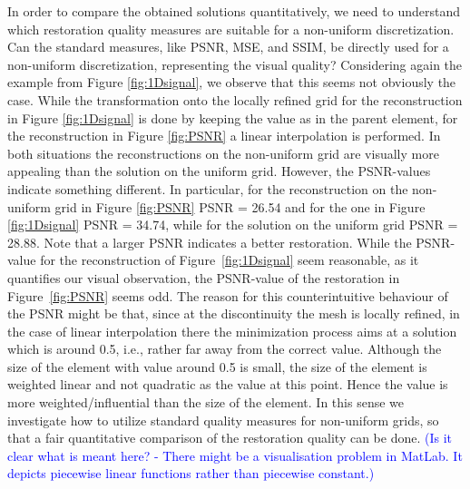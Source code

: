 \documentclass[enabledeprecatedfontcommands,cleardoublepage=empty,headsepline,twoside,11pt,DIV=15,BCOR=12mm,final]{scrartcl}
\begin{document}
 In order to compare the obtained solutions quantitatively, we need to understand which restoration quality measures are suitable for a non-uniform discretization. Can the standard measures, like PSNR, MSE, and SSIM, be directly used for a non-uniform discretization, representing the visual quality? Considering again the example from Figure \ref{fig:1Dsignal}, we observe that this seems not obviously the case. While the transformation onto the locally refined grid for the reconstruction in Figure \ref{fig:1Dsignal} is done by keeping the value as in the parent element, for the reconstruction in Figure \ref{fig:PSNR} a linear interpolation is performed. In both situations the reconstructions on the non-uniform grid are visually more appealing than the solution on the uniform grid. However, the PSNR-values indicate something different. In particular, for the reconstruction on the non-uniform grid in Figure \ref{fig:PSNR} PSNR = 26.54 and for the one in Figure \ref{fig:1Dsignal} PSNR = 34.74, while for the solution on the uniform grid PSNR = 28.88. Note that a larger PSNR indicates a better restoration. While the PSNR-value for the reconstruction of Figure~\ref{fig:1Dsignal} seem reasonable, as it quantifies our visual observation, the PSNR-value of the restoration in Figure~\ref{fig:PSNR} seems odd. The reason for this counterintuitive behaviour of the PSNR might be that, since at the discontinuity the mesh is locally refined, in the case of linear interpolation there the minimization process aims at a solution which is around 0.5, i.e., rather far away from the correct value. Although the size of the element with value around 0.5 is small, the size of the element is weighted linear and not quadratic as the value at this point. Hence the value is more weighted/influential than the size of the element. In this sense we investigate how to utilize standard quality measures for non-uniform grids, so that a fair quantitative comparison of the restoration quality can be done. \textcolor{blue}{(Is it clear what is meant here? - There might be a visualisation problem in MatLab. It depicts piecewise linear functions rather than piecewise constant.)}
\end{document}
